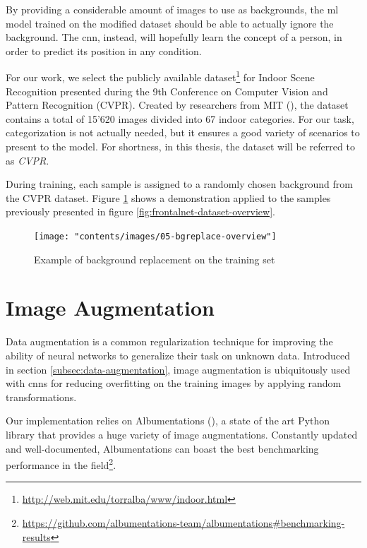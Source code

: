 By providing a considerable amount of images to use as backgrounds, the \gls{ml} model trained on the modified dataset should be able to actually ignore the background. The \gls{cnn}, instead, will hopefully learn the concept of a person, in order to predict its position in any condition.

\medskip

For our work, we select the publicly available dataset\footnote{\url{http://web.mit.edu/torralba/www/indoor.html}} for Indoor Scene Recognition presented during the 9th Conference on Computer Vision and Pattern Recognition (CVPR). Created by researchers from MIT (\cite{cvpr09}), the dataset contains a total of 15'620 images divided into 67 indoor categories. For our task, categorization is not actually needed, but it ensures a good variety of scenarios to present to the model. For shortness, in this thesis, the dataset will be referred to as \textit{CVPR}.

During training, each sample is assigned to a randomly chosen background from the CVPR dataset. Figure \ref{fig:bgreplace-example} shows a demonstration applied to the samples previously presented in figure \ref{fig:frontalnet-dataset-overview}. 

\vspace*{5ex}
\begin{figure}[!h]
	\centering
	\texttt{[image: "contents/images/05-bgreplace-overview"]}
	\caption[Example of background replacement on the training set]{Example of background replacement on the training set}
	\label{fig:bgreplace-example}
\end{figure}
\clearpage




\section{Image Augmentation}
\label{sec:implementation-imgaug}

Data augmentation is a common regularization technique for improving the ability of neural networks to generalize their task on unknown data. Introduced in section \ref{subsec:data-augmentation}, image augmentation is ubiquitously used with \gls{cnn}s for reducing overfitting on the training images by applying random transformations.

Our implementation relies on Albumentations (\cite{Buslaev_2020}), a state of the art Python library that provides a huge variety of image augmentations. Constantly updated and well-documented, Albumentations can boast the best benchmarking performance in the field\footnote{\url{https://github.com/albumentations-team/albumentations\#benchmarking-results}}.

